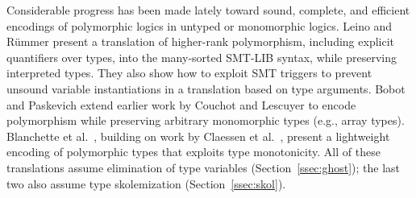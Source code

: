 Considerable progress has been made lately toward sound, complete, and efficient
encodings of polymorphic logics in untyped or monomorphic logics. Leino and
R\"ummer \cite{leino-ruemmer-2010} present a translation of higher-rank
polymorphism, including explicit quantifiers over types, into the many-sorted
SMT-LIB syntax, while preserving interpreted types. They also show how to
exploit SMT triggers to prevent unsound variable instantiations in a
translation based on type arguments. Bobot and Paskevich
\cite{bobot-paskevich-2011} extend earlier work by Couchot and Lescuyer
\cite{couchot-lescuyer-2007} to encode polymorphism while preserving
arbitrary monomorphic types (e.g., array types).
Blanchette et
al.\ \cite{blanchette-et-al-2012-mono}, building on work by Claessen et al.\
\cite{claessen-et-al-2011}, present a %
lightweight encoding of
polymorphic types that exploits type monotonicity. All of these translations
assume %
elimination of \theghost{} type variables
(Section~\ref{ssec:ghost}); the last two also assume type skolemization
(Section~\ref{ssec:skol}).


